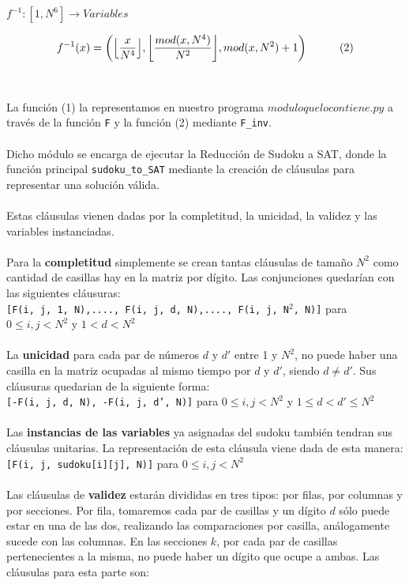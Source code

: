\documentclass[letterpaper,12pt]{article}
\DeclarePairedDelimiter\floor{\lfloor}{\rfloor}
\begin{document}
$f^{-1} : [1,N^6] \rightarrow Variables$

\begin{equation*}
    f^{-1}(x) = \left(\floor*{\frac{x}{N^4}},  \floor*{\frac{mod(x,N^4)}{N^2}}, mod(x,N^2) + 1 \right) \hspace{1cm} \label{eq:2} (2)
\end{equation*}\\
\\
La función (1) la representamos en nuestro programa $moduloquelocontiene.py$ a través de la función \texttt{F} y la función (2) mediante \texttt{F\_inv}.\\
\\
Dicho módulo se encarga de ejecutar la Reducción de Sudoku a SAT, donde la función principal \texttt{sudoku\_to\_SAT} mediante la creación de cláusulas para representar una solución válida.\\
\\
Estas cláusulas vienen dadas por la completitud, la unicidad, la validez y las variables instanciadas.\\
\\
Para la \textbf{completitud} simplemente se crean tantas cláusulas de tamaño $N^2$ como cantidad de casillas hay en la matriz por dígito. Las conjunciones quedarían con las siguientes cláusuras: \\

\texttt{[F(i, j, 1, N),...., F(i, j, d, N),...., F(i, j, N$^2$, N)]} para $0 \leq i,j < N^2$ y $1 < d < N^2$\\
\\
La \textbf{unicidad} para cada par de números $d$ y $d'$ entre 1 y $N^2$, no puede haber una casilla en la matriz ocupadas al mismo tiempo por $d$ y $d'$, siendo $d \neq d'$. Sus cláusuras quedarian de la siguiente forma:\\

\texttt{[-F(i, j, d, N),  -F(i, j, d', N)]} para 
$0 \leq i,j < N^2$ y $1 \leq d < d' \leq N^2$\\
\\
Las \textbf{instancias de las variables} ya asignadas del sudoku también tendran sus cláusulas unitarias. La representación de esta cláusula viene dada de esta manera:\\

\texttt{[F(i, j, sudoku[i][j], N)]} para $0 \leq i,j < N^2$\\
\\
Las cláusulas de \textbf{validez} estarán divididas en tres tipos: por filas, por columnas y por secciones. Por fila, tomaremos cada par de casillas y un dígito $d$ sólo puede estar en una de las dos, realizando las comparaciones por casilla, análogamente sucede con las columnas. En las secciones $k$, por cada par de casillas pertenecientes a la misma, no puede haber un dígito que ocupe a ambas. Las cláusulas para esta parte son:\\
\end{document}
